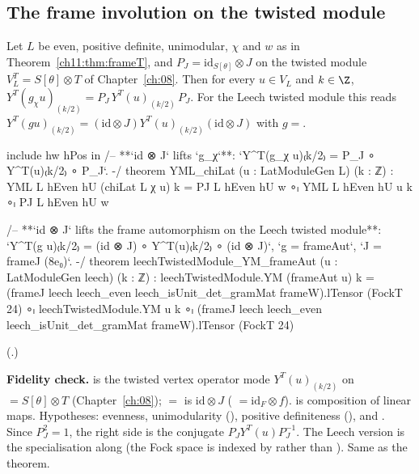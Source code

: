 \subsection{The frame involution on the twisted module}

\begin{theorem}\label{ch11:thm:YMLchi}
Let $L$ be even, positive definite, unimodular, $\chi$ and $w$ as in Theorem~\ref{ch11:thm:frameT},
and $P_J=\mathrm{id}_{S[\theta]}\otimes J$ on the twisted module $V_L^T=S[\theta]\otimes T$ of
Chapter~\ref{ch:08}.  Then for every $u\in V_L$ and $k\in\Z$,
$Y^T(g_\chi u)_{(k/2)}=P_J\,Y^T(u)_{(k/2)}\,P_J$.  For the Leech twisted module this reads
$Y^T(gu)_{(k/2)}=(\mathrm{id}\otimes J)Y^T(u)_{(k/2)}(\mathrm{id}\otimes J)$ with $g=$.
\end{theorem}
\begin{leancode}
include hw hPos in
/-- **`id ⊗ J` lifts `g_χ`**: `Y^T(g_χ u)₍k/2₎ = P_J ∘ Y^T(u)₍k/2₎ ∘ P_J`. -/
theorem YML_chiLat (u : LatModuleGen L) (k : ℤ) :
    YML L hEven hU (chiLat L χ u) k = PJ L hEven hU w ∘ₗ YML L hEven hU u k ∘ₗ PJ L hEven hU w

/-- **`id ⊗ J` lifts the frame automorphism on the Leech twisted module**:
`Y^T(g u)₍k/2₎ = (id ⊗ J) ∘ Y^T(u)₍k/2₎ ∘ (id ⊗ J)`, `g = frameAut`, `J = frameJ (8e₀)`. -/
theorem leechTwistedModule_YM_frameAut (u : LatModuleGen leech) (k : ℤ) :
    leechTwistedModule.YM (frameAut u) k
      = (frameJ leech leech_even leech_isUnit_det_gramMat frameW).lTensor (FockT 24) ∘ₗ
          leechTwistedModule.YM u k ∘ₗ
          (frameJ leech leech_even leech_isUnit_det_gramMat frameW).lTensor (FockT 24)
\end{leancode}
(.)
\begin{dictionary}
\textbf{Fidelity check.}   is the twisted vertex operator mode
$Y^T(u)_{(k/2)}$ on  $=S[\theta]\otimes T$ (Chapter~\ref{ch:08}); 
$=$ is $\mathrm{id}\otimes J$ ( $=
\mathrm{id}_F\otimes f$).   is composition of linear maps.  Hypotheses: evenness,
unimodularity (), positive definiteness (), and .  Since $P_J^2=1$, the right side is the conjugate $P_J
Y^T(u)P_J^{-1}$.  The Leech version is the specialisation along 
(the Fock space is indexed by  rather than ).  Same as the
theorem.
\end{dictionary}

